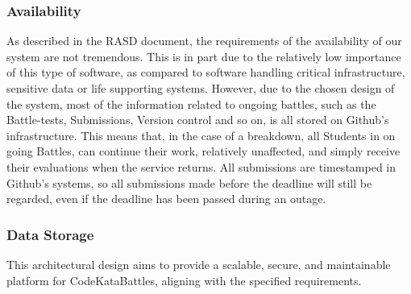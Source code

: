  \subsubsection{Availability}
As described in the RASD document, the requirements of the availability of our system are not tremendous. This is in part due to the relatively low importance of this type of software, as compared to software handling critical infrastructure, sensitive data or life supporting systems. However, due to the chosen design of the system, most of the information related to ongoing battles, such as the Battle-tests, Submissions, Version control and so on, is all stored on Github's infrastructure. This means that, in the case of a breakdown, all Students in on going Battles, can continue their work, relatively unaffected, and simply receive their evaluations when the service returns. All submissions are timestamped in Github's systems, so all submissions made before the deadline will still be regarded, even if the deadline has been passed during an outage. 

 \subsubsection{Data Storage}
This architectural design aims to provide a scalable, secure, and maintainable platform for CodeKataBattles, aligning with the specified requirements.